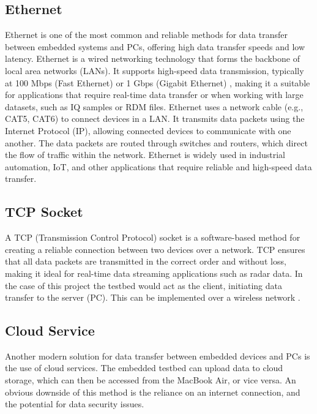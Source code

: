 \subsection{Ethernet}
Ethernet is one of the most common and reliable methods for data transfer between embedded systems and PCs, offering high data transfer speeds and low latency. Ethernet is a wired networking technology that forms the backbone of local area networks (LANs). It supports high-speed data transmission, typically at 100 Mbps (Fast Ethernet) or 1 Gbps (Gigabit Ethernet) \cite{rpi5_wifi}, making it a suitable for applications that require real-time data transfer or when working with large datasets, such as IQ samples or RDM files. Ethernet uses a network cable (e.g., CAT5, CAT6) to connect devices in a LAN. It transmits data packets using the Internet Protocol (IP), allowing connected devices to communicate with one another. The data packets are routed through switches and routers, which direct the flow of traffic within the network. Ethernet is widely used in industrial automation, IoT, and other applications that require reliable and high-speed data transfer.

\subsection{TCP Socket}
A TCP (Transmission Control Protocol) socket is a software-based method for creating a reliable connection between two devices over a network. TCP ensures that all data packets are transmitted in the correct order and without loss, making it ideal for real-time data streaming applications such as radar data. In the case of this project the testbed would act as the client, initiating data transfer to the server (PC). This can be implemented over a wireless network \cite{TCPoverview}.

\subsection{Cloud Service}
Another modern solution for data transfer between embedded devices and PCs is the use of cloud services. The embedded testbed can upload data to cloud storage, which can then be accessed from the MacBook Air, or vice versa. An obvious downside of this method is the reliance on an internet connection, and the potential for data security issues. 





